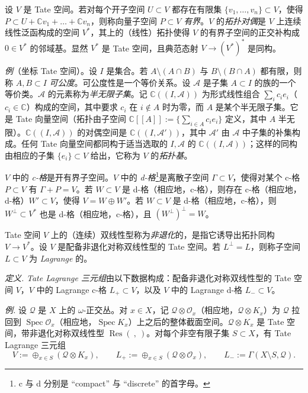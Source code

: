 设 $V$ 是 Tate 空间。若对每个开子空间 $U\subset V$ 都存在有限集 $\{v_{1},\dots,v_{n}\}\subset V$，使得 $P\subset U+\mathbb{C}v_{1}+\dots+\mathbb{C}v_{n}$，则称向量子空间 $P\subset V$ \emph{有界}。$V$ 的\emph{拓扑对偶}是 $V$ 上连续线性泛函构成的空间 $V^{*}$，其上的（线性）拓扑使得 $V$ 的有界子空间的正交补构成 $0\in V^{*}$ 的邻域基。显然 $V^{*}$ 是 Tate 空间，且典范态射 $V\to(V^{*})^{*}$ 是同构。

\emph{例}（坐标 Tate 空间）。设 $I$ 是集合。若 $A\setminus(A\cap B)$ 与 $B\setminus(B\cap A)$ 都有限，则称 $A,B\subset I$ \emph{可公度}。可公度性是一个等价关系。设 $\mathcal{A}$ 是子集 $A\subset I$ 的族的一个等价类。$\mathcal{A}$ 的元素称为\emph{半无限子集}。记 $\mathbb{C}((I,\mathcal{A}))$ 为形式线性组合 $\sum_{i}c_{i}e_{i}$（$c_{i}\in\mathbb{C}$）构成的空间，其中要求 $c_{i}$ 在 $i\notin A$ 时为零，而 $A$ 是某个半无限子集。它是 Tate 向量空间（拓扑由子空间 $\mathbb{C}[[A]]:=\{\sum_{i\in A}c_{i}e_{i}\}$ 定义，其中 $A$ 半无限）。$\mathbb{C}((I,\mathcal{A}))$ 的对偶空间是 $\mathbb{C}((I,\mathcal{A}'))$，其中 $\mathcal{A}'$ 由 $\mathcal{A}$ 中子集的补集构成。任何 Tate 向量空间都同构于适当选取的 $I,\mathcal{A}$ 的 $\mathbb{C}((I,\mathcal{A}))$；这样的同构由相应的子集 $\{e_{i}\}\subset V$ 给出，它称为 $V$ 的\emph{拓扑基}。

$V$ 中的 \emph{c-格}是开有界子空间。$V$ 中的 \emph{d-格}\footnote{c 与 d 分别是 “compact” 与 “discrete” 的首字母。}是离散子空间 $\Gamma\subset V$，使得对某个 c-格 $P\subset V$ 有 $\Gamma+P=V$。若 $W\subset V$ 是 d-格（相应地，c-格），则存在 c-格（相应地，d-格）$W'\subset V$，使得 $V=W\oplus W'$。若 $W\subset V$ 是 d-格（相应地，c-格），则 $W^{\perp}\subset V^{*}$ 也是 d-格（相应地，c-格），且 $(W^{\perp})^{\perp}=W$。

Tate 空间 $V$ 上的（连续）双线性型称为\emph{非退化}的，是指它诱导出拓扑同构 $V\to V^{*}$。设 $V$ 是配备非退化对称双线性型的 Tate 空间。若 $L^{\perp}=L$，则称子空间 $L\subset V$ 为 \emph{Lagrange} 的。

\emph{定义.} \emph{Tate Lagrange 三元组}由以下数据构成：配备非退化对称双线性型的 Tate 空间 $V$，$V$ 中的 Lagrange c-格 $L_{+}\subset V$，以及 $V$ 中的 Lagrange d-格 $L_{-}\subset V$。

\emph{例.} 设 $\mathcal{Q}$ 是 $X$ 上的 $\omega$-正交丛。对 $x\in X$，记 $\mathcal{Q}\otimes\mathcal{O}_{x}$（相应地，$\mathcal{Q}\otimes K_{x}$）为 $\mathcal{Q}$ 拉回到 $\operatorname{Spec}\mathcal{O}_{x}$（相应地，$\operatorname{Spec}K_{x}$）上之后的整体截面空间。$\mathcal{Q}\otimes K_{x}$ 是 Tate 空间，带非退化对称双线性型 $\operatorname{Res}(\ ,\ )$。对每个非空有限子集 $S\subset X$，有 Tate Lagrange 三元组
\begin{equation}\tag{181}
V:=\oplus_{x\in S}(\mathcal{Q}\otimes K_{x}),\qquad L_{+}:=\oplus_{x\in S}(\mathcal{Q}\otimes\mathcal{O}_{x}),\qquad L_{-}:=\Gamma(X\setminus S,\mathcal{Q}).
\end{equation}

